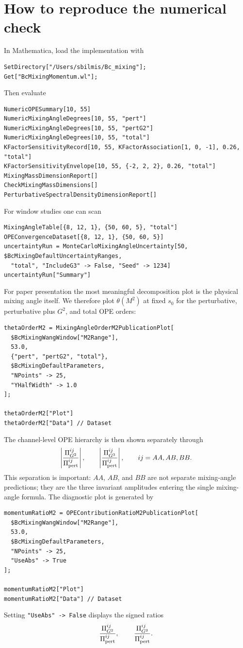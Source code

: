 \documentclass[11pt]{article}
\begin{document}
\section{How to reproduce the numerical check}

In Mathematica, load the implementation with
\begin{verbatim}
SetDirectory["/Users/sbilmis/Bc_mixing"];
Get["BcMixingMomentum.wl"];
\end{verbatim}
Then evaluate
\begin{verbatim}
NumericOPESummary[10, 55]
NumericMixingAngleDegrees[10, 55, "pert"]
NumericMixingAngleDegrees[10, 55, "pertG2"]
NumericMixingAngleDegrees[10, 55, "total"]
KFactorSensitivityRecord[10, 55, KFactorAssociation[1, 0, -1], 0.26, "total"]
KFactorSensitivityEnvelope[10, 55, {-2, 2, 2}, 0.26, "total"]
MixingMassDimensionReport[]
CheckMixingMassDimensions[]
PerturbativeSpectralDensityDimensionReport[]
\end{verbatim}
For window studies one can scan
\begin{verbatim}
MixingAngleTable[{8, 12, 1}, {50, 60, 5}, "total"]
OPEConvergenceDataset[{8, 12, 1}, {50, 60, 5}]
uncertaintyRun = MonteCarloMixingAngleUncertainty[50, $BcMixingDefaultUncertaintyRanges,
  "total", "IncludeG3" -> False, "Seed" -> 1234]
uncertaintyRun["Summary"]
\end{verbatim}

For paper presentation the most meaningful decomposition plot is the physical
mixing angle itself.  We therefore plot \(\theta(M^2)\) at fixed \(s_0\) for
the perturbative, perturbative plus \(G^2\), and total OPE orders:
\begin{verbatim}
thetaOrderM2 = MixingAngleOrderM2PublicationPlot[
  $BcMixingWangWindow["M2Range"],
  53.0,
  {"pert", "pertG2", "total"},
  $BcMixingDefaultParameters,
  "NPoints" -> 25,
  "YHalfWidth" -> 1.0
];

thetaOrderM2["Plot"]
thetaOrderM2["Data"] // Dataset
\end{verbatim}

The channel-level OPE hierarchy is then shown separately through
\[
  \left|
  \frac{\Pi_{G^2}^{ij}}{\Pi_{\rm pert}^{ij}}
  \right|,
  \qquad
  \left|
  \frac{\Pi_{G^3}^{ij}}{\Pi_{\rm pert}^{ij}}
  \right|,
  \qquad ij=AA,AB,BB.
\]
This separation is important: \(AA\), \(AB\), and \(BB\) are not separate
mixing-angle predictions; they are the three invariant amplitudes entering the
single mixing-angle formula.  The diagnostic plot is generated by
\begin{verbatim}
momentumRatioM2 = OPEContributionRatioM2PublicationPlot[
  $BcMixingWangWindow["M2Range"],
  53.0,
  $BcMixingDefaultParameters,
  "NPoints" -> 25,
  "UseAbs" -> True
];

momentumRatioM2["Plot"]
momentumRatioM2["Data"] // Dataset
\end{verbatim}
Setting \texttt{"UseAbs" -> False} displays the signed ratios
\begin{equation}
  \frac{\Pi_{G^2}^{ij}}{\Pi_{\rm pert}^{ij}},\,
  \qquad
  \frac{\Pi_{G^3}^{ij}}{\Pi_{\rm pert}^{ij}}.
\end{equation}
\end{document}
